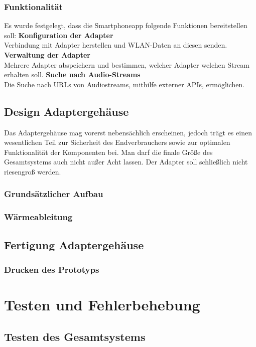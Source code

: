 \documentclass[]{article}
\begin{document}
\subsubsection{Funktionalität}
Es wurde festgelegt, dass die Smartphoneapp folgende Funktionen bereitstellen soll:
\vspace{4mm}\newline
\textbf{Konfiguration der Adapter}  \\
Verbindung mit Adapter herstellen und WLAN-Daten an diesen senden.
\vspace{4mm}\newline
\textbf{Verwaltung der Adapter} \\
Mehrere Adapter abspeichern und bestimmen, welcher Adapter welchen Stream erhalten soll.
\vspace{4mm}\newline
\textbf{Suche nach Audio-Streams} \\
Die Suche nach URLs von Audiostreams, mithilfe externer APIs, ermöglichen.
\subsection{Design Adaptergehäuse}
Das Adaptergehäuse mag vorerst nebensächlich erscheinen, jedoch trägt es einen wesentlichen Teil zur Sicherheit des Endverbrauchers sowie zur optimalen Funktionalität der Komponenten bei. Man darf die finale Größe des Gesamtsystems auch nicht außer Acht lassen. Der Adapter soll schließlich nicht riesengroß werden. 
\subsubsection{Grundsätzlicher Aufbau}
\subsubsection{Wärmeableitung}
\subsection{Fertigung Adaptergehäuse}
\subsubsection{Drucken des Prototyps}

\section{Testen und Fehlerbehebung}
\subsection{Testen des Gesamtsystems}
\end{document}
